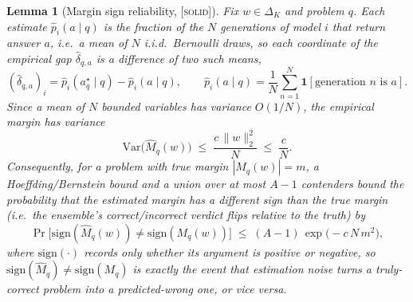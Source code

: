 \documentclass{article} %
\newtheorem{lemma}[theorem]{Lemma}
\providecommand{\simplex}{\Delta_K}
\providecommand{\dhat}{\widehat{\delta}}
\providecommand{\phat}{\widehat{p}}
\providecommand{\Mhat}{\widehat{M}}
\providecommand{\sign}{\mathrm{sign}}
\providecommand{\solid}{\textsc{[solid]}}
\providecommand{\solid}{}
\begin{document}
\begin{lemma}[Margin sign reliability, \solid]
\label{lem:1}
Fix $w\in\simplex$ and problem $q$. Each estimate $\phat_i(a\mid q)$ is the
fraction of the $N$ generations of model $i$ that return answer $a$, i.e.\ a mean
of $N$ i.i.d.\ Bernoulli draws, so each coordinate of the empirical gap
$\dhat_{q,a}$ is a difference of two such means,
\begin{equation}
\label{eq:bern}
(\dhat_{q,a})_i = \phat_i(a_q^\star\mid q) - \phat_i(a\mid q),
\qquad
\phat_i(a\mid q) = \frac1N\sum_{n=1}^N \mathbf 1[\text{generation }n\text{ is }a].
\end{equation}
Since a mean of $N$ bounded variables has variance $O(1/N)$, the empirical margin
has variance
\begin{equation}
\label{eq:var}
\mathrm{Var}\big(\Mhat_q(w)\big) \;\le\; \frac{c\,\|w\|_2^2}{N} \;\le\; \frac{c}{N}.
\end{equation}
Consequently, for a problem with true margin $|M_q(w)| = m$, a Hoeffding/Bernstein
bound \citep{hoeffding1963probability} and a union over at most $A-1$ contenders
bound the probability that the estimated margin has a \emph{different sign} than
the true margin (i.e.\ the ensemble's correct/incorrect verdict flips relative to
the truth) by
\begin{equation}
\label{eq:signflip}
\Pr\!\big[\sign(\Mhat_q(w)) \ne \sign(M_q(w))\big]
\;\le\; (A-1)\,\exp\!\big(-c\,N\,m^2\big),
\end{equation}
where $\sign(\cdot)$ records only whether its argument is positive or negative,
so $\sign(\Mhat_q)\ne\sign(M_q)$ is exactly the event that estimation noise turns
a truly-correct problem into a predicted-wrong one, or vice versa.
\end{lemma}
\end{document}
